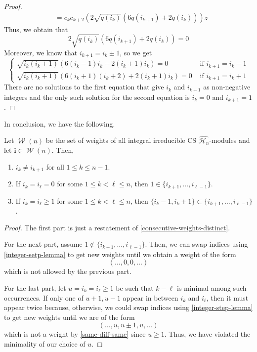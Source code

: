 \documentclass[11pt,leqno,oneside]{amsbook}
\renewcommand{\H}{\mathcal{H}}
\DeclareMathOperator{\wts}{\mathcal{W}}
\renewcommand{\vec}[1]{\mathbf{#1}}
\numberwithin{thm}{section}
\begin{document}
\begin{proof}
\begin{align*}
    & = c_k c_{k+2}(2 \sqrt{q(i_k)}(6 q(i_{k+1})+2q(i_k)))z
  \end{align*}
  Thus, we obtain that \[
    2 \sqrt{q(i_k)}(6 q(i_{k+1})+2q(i_k)) = 0
  \]
  Moreover, we know that \(i_{k+1} = i_k \pm 1\), so we get \[
    \begin{cases}
      \sqrt{i_k(i_k+1)}(6(i_k-1)i_k+2(i_k+1)i_k) = 0 & \text{ if
      }i_{k+1} = i_k - 1\\
      \sqrt{i_k(i_k+1)}(6(i_k +1)(i_k+2)+2(i_k+1)i_k) = 0 & \text{ if
      }i_{k+1} = i_k+1
    \end{cases}
  \]
  There are no solutions to the first equation that give \(i_k\) and
  \(i_{k+1}\) as non-negative integers and the only such solution for
  the second equation is \(i_k = 0\) and \(i_{k+1} = 1\).
\end{proof}
In conclusion, we have the following.
\begin{thm}
  Let \(\wts(n)\) be the set of weights of all integral irreducible CS
  \(\hat{\H_n}\)-modules and let \(\vec{i} \in \wts(n)\). Then,
  \begin{enumerate}
  \item \(i_k \neq i_{k+1}\) for all \(1 \leq k \leq n-1\).
  \item If \(i_k = i_{\ell} = 0\) for some \(1 \leq k < \ell \leq n\),
    then \(1 \in \{i_{k+1}, \ldots, i_{\ell-1}\}\).
  \item If \(i_k = i_\ell \geq 1\) for some \(1 \leq k < \ell \leq
    n\), then \(\{i_k -1, i_k+1\} \subset \{i_{k+1} ,\ldots, i_{\ell-1}\}\).
  \end{enumerate}
\end{thm}
\begin{proof}
  The first part is just a restatement of
  \ref{consecutive-weights-distinct}.

  For the next part, assume \(1 \not \in
  \{i_{k+1},\ldots,i_{\ell-1}\}\). Then, we can swap indices using
  \ref{integer-setp-lemma} to get new weights until we obtain a weight
  of the form \[
    (\ldots, 0, 0, \ldots)
  \]
  which is not allowed by the previous part.
  
  For the last part, let \(u = i_k = i_\ell \geq 1\) be such that
  \(k-\ell\) is minimal among such occurrences. If only one of
  \(u+1, u-1\) appear in between \(i_k\) and \(i_\ell\), then it must
  appear twice because, otherwise, we could swap indices using
  \ref{integer-step-lemma} to get new weights until we are of the form
  \[
    (\ldots, u, u\pm 1, u, \ldots)
  \]
  which is not a weight by \ref{same-diff-same} since \(u \geq 1\). Thus,
  we have violated the minimality of our choice of \(u\).
\end{proof}
\end{document}
